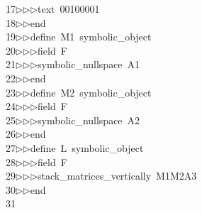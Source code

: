 \begin{tabbing}
17\>$\triangleright$\>$\triangleright$\>$\triangleright$\>text\ 00100001\ \\[0pt]
18\>$\triangleright$\>$\triangleright$\>end\ \\[0pt]
19\>$\triangleright$\>$\triangleright$\>define\ M1\ symbolic\_object\ \\[0pt]
20\>$\triangleright$\>$\triangleright$\>$\triangleright$\>field\ F\ \\[0pt]
21\>$\triangleright$\>$\triangleright$\>$\triangleright$\>symbolic\_nullspace\ A1\ \\[0pt]
22\>$\triangleright$\>$\triangleright$\>end\ \\[0pt]
23\>$\triangleright$\>$\triangleright$\>define\ M2\ symbolic\_object\ \\[0pt]
24\>$\triangleright$\>$\triangleright$\>$\triangleright$\>field\ F\ \\[0pt]
25\>$\triangleright$\>$\triangleright$\>$\triangleright$\>symbolic\_nullspace\ A2\ \\[0pt]
26\>$\triangleright$\>$\triangleright$\>end\ \\[0pt]
27\>$\triangleright$\>$\triangleright$\>define\ L\ symbolic\_object\ \\[0pt]
28\>$\triangleright$\>$\triangleright$\>$\triangleright$\>field\ F\ \\[0pt]
29\>$\triangleright$\>$\triangleright$\>$\triangleright$\>stack\_matrices\_vertically\ M1M2A3\ \\[0pt]
30\>$\triangleright$\>$\triangleright$\>end\\[0pt]
31\>\end{tabbing}
